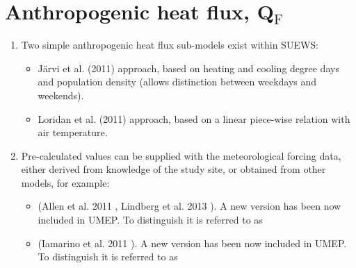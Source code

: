 \documentclass[letterpaper,10pt,english]{sphinxmanual}
\begin{document}
\section{Anthropogenic heat flux, Q$_{\text{F}}$}
\label{\detokenize{parameterisations-and-sub-models:anthropogenic-heat-flux-qf}}\begin{enumerate}
\item {} 
Two simple anthropogenic heat flux sub-models exist within SUEWS:
\begin{itemize}
\item {} 
Järvi et al. (2011) \label{\detokenize{parameterisations-and-sub-models:id3}}{\hyperref[\detokenize{references:j11}]{\sphinxcrossref{{[}J11{]}}}} approach, based on heating and cooling
degree days and population density (allows distinction between
weekdays and weekends).

\item {} 
Loridan et al. (2011) \label{\detokenize{parameterisations-and-sub-models:id4}}{\hyperref[\detokenize{references:l2011}]{\sphinxcrossref{{[}L2011{]}}}} approach, based on a linear piece-wise
relation with air temperature.

\end{itemize}

\item {} 
Pre-calculated values can be supplied with the meteorological forcing
data, either derived from knowledge of the study site, or obtained
from other models, for example:
\begin{itemize}
\item {} 
 (Allen et al. 2011 \label{\detokenize{parameterisations-and-sub-models:id5}}{\hyperref[\detokenize{references:lucy}]{\sphinxcrossref{{[}lucy{]}}}}, Lindberg et al. 2013 \label{\detokenize{parameterisations-and-sub-models:id6}}{\hyperref[\detokenize{references:lucy2}]{\sphinxcrossref{{[}lucy2{]}}}}). A
new version has been now included in UMEP. To distinguish it is
referred to as

\item {} 
 (Iamarino et al. 2011 \label{\detokenize{parameterisations-and-sub-models:id7}}{\hyperref[\detokenize{references:i11}]{\sphinxcrossref{{[}I11{]}}}}). A new version has been
now included in UMEP. To distinguish it is referred to as

\end{itemize}

\end{enumerate}
\end{document}
